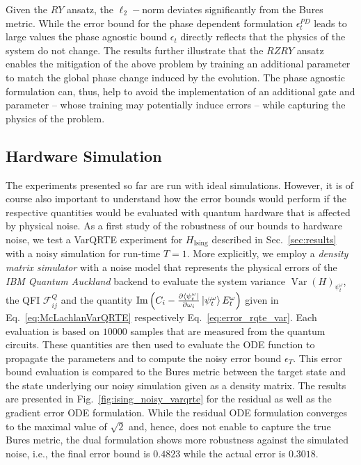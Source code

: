 \documentclass[twocolumn, aps, pra, superscriptaddress]{revtex4-1}
\DeclareMathOperator{\Var}{Var}
\begin{document}
Given the $RY$ ansatz, the $\ell_2-$norm deviates significantly from the Bures metric. While the error bound for the phase dependent formulation $\epsilon^{PD}_t$ leads to large values the phase agnostic bound $\epsilon_t$ directly reflects that the physics of the system do not change.
The results further illustrate that the $RZRY$ ansatz enables the mitigation of the above problem by training an additional parameter to match the global phase change induced by the evolution. 
The phase agnostic formulation can, thus, help to avoid the implementation of an additional gate and parameter -- whose training may potentially induce errors -- while capturing the physics of the problem.

\subsection{Hardware Simulation}
\label{app:HW}

The experiments presented so far are run with ideal simulations. However, it is of course also important to understand how the error bounds would perform if the respective quantities would be evaluated with quantum hardware that is affected by physical noise.
As a first study of the robustness of our bounds to hardware noise, we test a VarQRTE experiment for $H_{\text{Ising}}$ described in Sec.~\ref{sec:results} with a noisy simulation for run-time $T=1$. More explicitly, we employ a \textit{density matrix simulator} with a noise model that represents the physical errors of the \textit{IBM Quantum Auckland} backend to evaluate the system variance $\Var(H)_{\psi^{\omega}_t}$, the QFI $\mathcal{F}^Q_{ij}$ and the quantity $\text{Im}\left(C_i -  \frac{\partial \bra{\psi^{\omega}_t}}{\partial \omega_i}\ket{\psi^{\omega}_t}E_t^{\omega}\right)$ given in Eq.~\eqref{eq:McLachlanVarQRTE} respectively Eq.~\eqref{eq:error_rqte_var}. Each evaluation is based on $10000$ samples that are measured from the quantum circuits. These quantities are then used to evaluate the ODE function to propagate the parameters and to compute the noisy error bound $\epsilon_{T}$. This error bound evaluation is compared to the Bures metric between the target state and the state underlying our noisy simulation given as a density matrix. 
The results are presented in Fig.~\ref{fig:ising_noisy_varqrte} for the residual as well as the gradient error ODE formulation. While the residual ODE formulation converges to the maximal value of $\sqrt{2}$ and, hence, does not enable to capture the true Bures metric, the dual formulation shows more robustness against the simulated noise, i.e., the final error bound is $0.4823$ while the actual error is $0.3018$.
\end{document}
